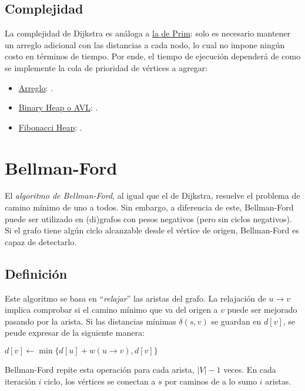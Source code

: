 \subsection{Complejidad}

La complejidad de Dijkstra es análoga a \hyperref[complejidad-prim]{la de Prim}: solo es necesario mantener un arreglo adicional con las distancias a cada nodo, lo cual no impone ningún costo en términos de tiempo. Por ende, el tiempo de ejecución dependerá de como se implemente la cola de prioridad de vértices a agregar:
\begin{itemize}
    \item \underline{Arreglo}: .
    \item \underline{Binary Heap o AVL}: .
    \item \underline{Fibonacci Heap}: .
\end{itemize}

\section{Bellman-Ford}

El \textit{algoritmo de Bellman-Ford}, al igual que el de Dijkstra, resuelve el problema de camino mínimo de uno a todos. Sin embargo, a diferencia de este, Bellman-Ford puede ser utilizado en (di)grafos con pesos negativos (pero sin ciclos negativos). Si el grafo tiene algún ciclo alcanzable desde el vértice de origen, Bellman-Ford es capaz de detectarlo.

\subsection{Definición}

Este algoritmo se basa en ``\textit{relajar}'' las aristas del grafo. La relajación de $u \rightarrow v$ implica comprobar si el camino mínimo que va del origen a $v$ puede ser mejorado pasando por la arista. Si las distancias mínimas $\delta(s, v)$ se guardan en $d[v]$, se peude expresar de la siguiente manera:

\begin{codebox}
    \li $d[v] \gets \min{\{d[u] + w(u \rightarrow v), d[v]\}}$
\end{codebox}

Bellman-Ford repite esta operación para cada arista, $|V| - 1$ veces. En cada iteración $i$ ciclo, los vértices se conectan a $s$ por caminos de a lo sumo $i$ aristas.

